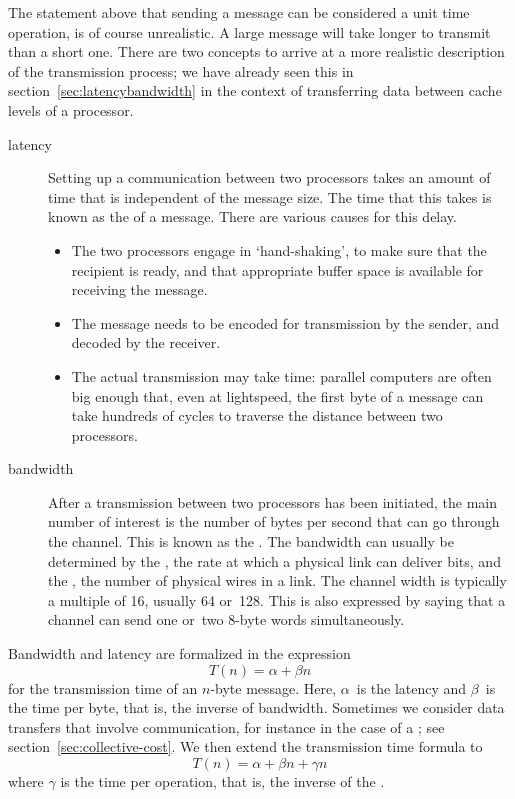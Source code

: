 The statement above that sending a message can be considered a unit
time operation, is of course unrealistic. A large message will take
longer to transmit than a short one. There are two concepts to arrive
at a more realistic description of the transmission process; we have
already seen this in section~\ref{sec:latencybandwidth} in the context
of transferring data between cache levels of a processor.
\begin{description}
\item[latency] Setting up a communication between two processors takes
  an amount of time that is independent of the message size. The time
  that this takes is known as the  of a message.
  There are various causes for this delay.
  \begin{itemize}
  \item The two processors engage in `hand-shaking', to make sure that
    the recipient is ready, and that appropriate buffer space is
    available for receiving the message.
  \item The message needs to be encoded for transmission by the sender,
    and decoded by the receiver.
  \item The actual transmission may take time: parallel computers are
    often big enough that, even at lightspeed, the first byte of a
    message can take hundreds of cycles to traverse the distance
    between two processors.
  \end{itemize}
\item[bandwidth] After a transmission between two processors has been
  initiated, the main number of interest is the number of bytes per
  second that can go through the channel. This is known as the
  . The bandwidth can usually be determined by
  the , the rate at which a physical link can
  deliver bits, and the , the number of
  physical wires in a link. The channel width is typically a multiple
  of 16, usually 64 or~128. This is also expressed by saying that a
  channel can send one or~two 8-byte words simultaneously.
\end{description}

Bandwidth and latency are formalized in the expression
\[ T(n)=\alpha+\beta n \]
for the transmission time of an $n$-byte message. Here, $\alpha$~is
the latency and $\beta$~is the time per byte, that is, the inverse of
bandwidth. Sometimes we consider data transfers that involve
communication, for instance in the case of a ; see section~\ref{sec:collective-cost}. We then extend
the transmission time formula to
\[ T(n)=\alpha+\beta n+\gamma n \]
where $\gamma$ is the time per operation, that is, the inverse of the
.

